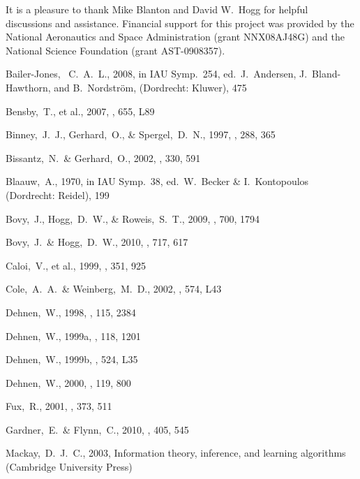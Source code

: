 \documentclass[12pt,preprint]{aastex}
\newcommand{\etal}{et al.}
\begin{document}
\acknowledgements It is a pleasure to thank Mike Blanton and David
W.~Hogg for helpful discussions and assistance.  Financial support for
this project was provided by the National Aeronautics and Space
Administration (grant NNX08AJ48G) and the National Science Foundation
(grant AST-0908357).

\begin{thebibliography}{}

  Bailer-Jones, ~C.~A.~L., 2008,
  in IAU Symp.~254, ed.~J.~Andersen, J.~Bland-Hawthorn, and B.~Nordstr\"{o}m, (Dordrecht: Kluwer), 475  

\bibitem[Bensby \etal(2007)]{Bensby07a}
  Bensby,~T., \etal, 2007,
  \apjl, 655, L89

  Binney,~J.~J., Gerhard,~O., \& Spergel,~D.~N., 1997,
  \mnras, 288, 365

  Bissantz,~N.~\& Gerhard,~O., 2002,
  \mnras, 330, 591

  Blaauw,~A., 1970, in IAU Symp.~38, ed.~W.~Becker \& I.~Kontopoulos (Dordrecht: Reidel), 199

 Bovy,~J., Hogg,~D.~W., \& Roweis,~S.~T., 2009,
  \apj, 700, 1794

 Bovy,~J.~\& Hogg,~D.~W., 2010,
  \apj, 717, 617

\bibitem[Caloi \etal(1999)]{caloi99a}
  Caloi,~V., \etal, 1999,
  \aap, 351, 925

  Cole,~A.~A.~\& Weinberg,~M.~D., 2002,
  \apjl, 574, L43

Dehnen,~W., 1998, \aj, 115, 2384

  Dehnen,~W., 1999a, \aj, 118, 1201

  Dehnen,~W., 1999b, \apj, 524, L35

  Dehnen,~W., 2000, \aj, 119, 800

  Fux,~R., 2001,
  \aap, 373, 511

  Gardner,~E.~\& Flynn,~C., 2010,
  \mnras, 405, 545

  Mackay,~D.~J.~C., 2003,
  Information theory, inference, and learning algorithms (Cambridge University Press)


\end{thebibliography}
\end{document}
